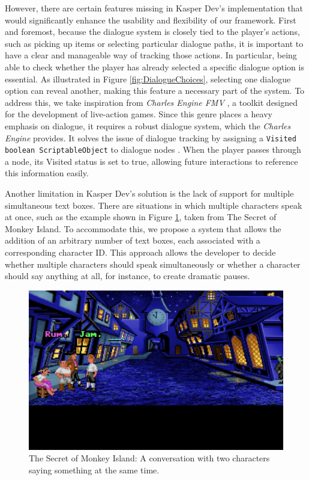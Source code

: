 However, there are certain features missing in Kasper Dev's implementation that would significantly enhance the usability and flexibility of our framework. First and foremost, because the dialogue system is closely tied to the player’s actions, such as picking up items or selecting particular dialogue paths, it is important to have a clear and manageable way of tracking those actions. In particular, being able to check whether the player has already selected a specific dialogue option is essential. As illustrated in Figure \ref{fig:DialogueChoices}, selecting one dialogue option can reveal another, making this feature a necessary part of the system. To address this, we take inspiration from \textit{Charles Engine FMV} \cite{CharlesEngine}, a toolkit designed for the development of live-action games. Since this genre places a heavy emphasis on dialogue, it requires a robust dialogue system, which the \textit{Charles Engine} provides. It solves the issue of dialogue tracking by assigning a \verb|Visited boolean ScriptableObject| to dialogue nodes \cite{CharlesEngine-tut}. When the player passes through a node, its Visited status is set to true, allowing future interactions to reference this information easily.

Another limitation in Kasper Dev's solution is the lack of support for multiple simultaneous text boxes. There are situations in which multiple characters speak at once, such as the example shown in Figure \ref{fig:DialogueConvo}, taken from The Secret of Monkey Island. To accommodate this, we propose a system that allows the addition of an arbitrary number of text boxes, each associated with a corresponding character ID. This approach allows the developer to decide whether multiple characters should speak simultaneously or whether a character should say anything at all, for instance, to create dramatic pauses.

\begin{figure}[H]
\centering
\includegraphics[width=.8\linewidth]{img/Dialogue-talking_at_the_same_time.png}
\caption{The Secret of Monkey Island: A conversation with two characters saying something at the same time.}
\label{fig:DialogueConvo}
\end{figure}

